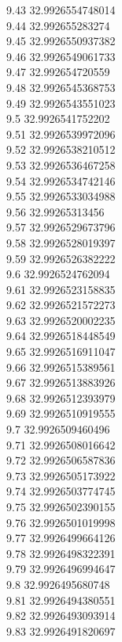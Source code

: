 {9.43	32.9926554748014\\
9.44	32.992655283274\\
9.45	32.9926550937382\\
9.46	32.9926549061733\\
9.47	32.992654720559\\
9.48	32.9926545368753\\
9.49	32.9926543551023\\
9.5	32.9926541752202\\
9.51	32.9926539972096\\
9.52	32.9926538210512\\
9.53	32.9926536467258\\
9.54	32.9926534742146\\
9.55	32.9926533034988\\
9.56	32.99265313456\\
9.57	32.9926529673796\\
9.58	32.9926528019397\\
9.59	32.9926526382222\\
9.6	32.9926524762094\\
9.61	32.9926523158835\\
9.62	32.9926521572273\\
9.63	32.9926520002235\\
9.64	32.9926518448549\\
9.65	32.9926516911047\\
9.66	32.9926515389561\\
9.67	32.9926513883926\\
9.68	32.9926512393979\\
9.69	32.9926510919555\\
9.7	32.9926509460496\\
9.71	32.9926508016642\\
9.72	32.9926506587836\\
9.73	32.9926505173922\\
9.74	32.9926503774745\\
9.75	32.9926502390155\\
9.76	32.9926501019998\\
9.77	32.9926499664126\\
9.78	32.9926498322391\\
9.79	32.9926496994647\\
9.8	32.9926495680748\\
9.81	32.9926494380551\\
9.82	32.9926493093914\\
9.83	32.9926491820697\\
}
